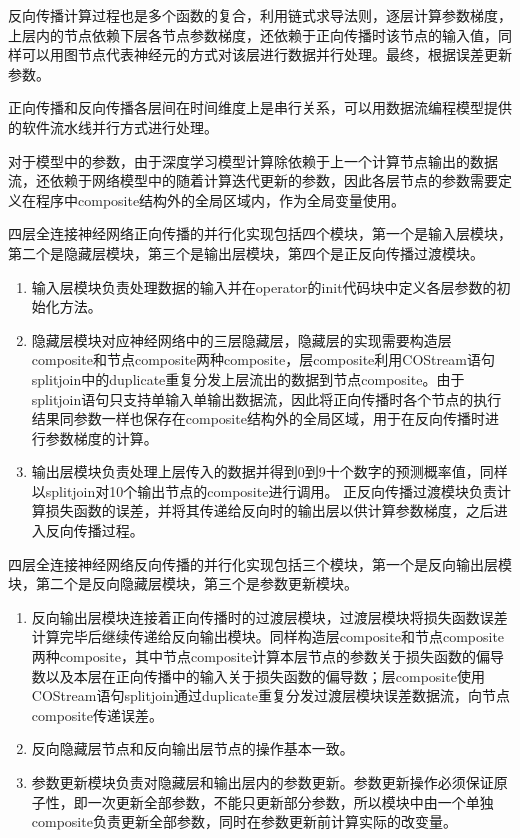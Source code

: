 反向传播计算过程也是多个函数的复合，利用链式求导法则，逐层计算参数梯度，上层内的节点依赖下层各节点参数梯度，还依赖于正向传播时该节点的输入值，同样可以用图节点代表神经元的方式对该层进行数据并行处理。最终，根据误差更新参数。

正向传播和反向传播各层间在时间维度上是串行关系，可以用数据流编程模型提供的软件流水线并行方式进行处理。

对于模型中的参数，由于深度学习模型计算除依赖于上一个计算节点输出的数据流，还依赖于网络模型中的随着计算迭代更新的参数，因此各层节点的参数需要定义在程序中composite结构外的全局区域内，作为全局变量使用。

四层全连接神经网络正向传播的并行化实现包括四个模块，第一个是输入层模块，第二个是隐藏层模块，第三个是输出层模块，第四个是正反向传播过渡模块。

\begin{enumerate}
\item 输入层模块负责处理数据的输入并在operator的init代码块中定义各层参数的初始化方法。
\item 隐藏层模块对应神经网络中的三层隐藏层，隐藏层的实现需要构造层composite和节点composite两种composite，层composite利用COStream语句splitjoin中的duplicate重复分发上层流出的数据到节点composite。由于splitjoin语句只支持单输入单输出数据流，因此将正向传播时各个节点的执行结果同参数一样也保存在composite结构外的全局区域，用于在反向传播时进行参数梯度的计算。
\item 输出层模块负责处理上层传入的数据并得到0到9十个数字的预测概率值，同样以splitjoin对10个输出节点的composite进行调用。
正反向传播过渡模块负责计算损失函数的误差，并将其传递给反向时的输出层以供计算参数梯度，之后进入反向传播过程。

\end{enumerate}

四层全连接神经网络反向传播的并行化实现包括三个模块，第一个是反向输出层模块，第二个是反向隐藏层模块，第三个是参数更新模块。

\begin{enumerate}
\item 反向输出层模块连接着正向传播时的过渡层模块，过渡层模块将损失函数误差计算完毕后继续传递给反向输出模块。同样构造层composite和节点composite两种composite，其中节点composite计算本层节点的参数关于损失函数的偏导数以及本层在正向传播中的输入关于损失函数的偏导数；层composite使用COStream语句splitjoin通过duplicate重复分发过渡层模块误差数据流，向节点composite传递误差。
\item 反向隐藏层节点和反向输出层节点的操作基本一致。
\item 参数更新模块负责对隐藏层和输出层内的参数更新。参数更新操作必须保证原子性，即一次更新全部参数，不能只更新部分参数，所以模块中由一个单独composite负责更新全部参数，同时在参数更新前计算实际的改变量。

\end{enumerate}

